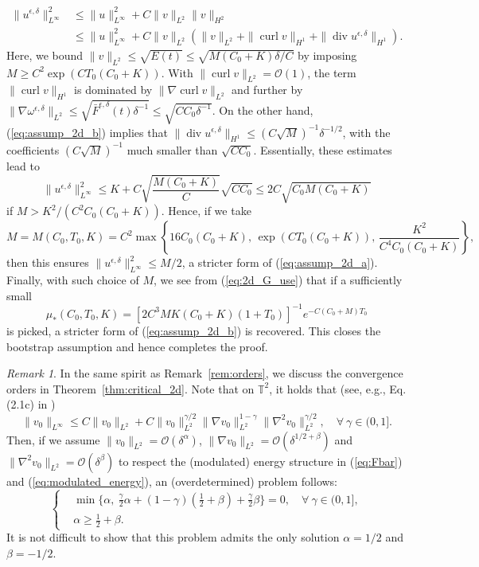 \documentclass[reqno,10pt]{amsart}
\theoremstyle{definition}
\theoremstyle{remark}
\newtheorem{remark}[theorem]{Remark}
\numberwithin{equation}{section}
\DeclareMathOperator{\dive}{div}
\DeclareMathOperator{\curl}{curl}
\begin{document}
\[
\begin{aligned}
    \|u^{\epsilon,\delta}\|_{L^\infty}^2 &\le \|u\|_{L^\infty}^2 + C\|v\|_{L^2}\|v\|_{H^2} \\
    &\le \|u\|_{L^\infty}^2 + C\|v\|_{L^2} \left( \|v\|_{L^2} + \|\curl v\|_{H^1} + \|\dive u^{\epsilon,\delta}\|_{H^1} \right).
\end{aligned}
\]
Here, we bound $\|v\|_{L^2} \le \sqrt{E(t)}\le \sqrt{M(C_0+K)\delta/C}$ by imposing $M\ge C^2 \exp{(CT_0(C_0+K))}$. With $\|\curl v\|_{L^2}=\mathcal O(1)$, the term $\|\curl v\|_{H^1}$ is dominated by $\|\nabla \curl v\|_{L^2}$ and further by $\|\nabla \omega^{\epsilon,\delta}\|_{L^2} \le \sqrt{\bar F^{\epsilon,\delta}(t)\delta^{-1}} \le \sqrt{CC_0\delta^{-1}}$. On the other hand, (\ref{eq:assump_2d_b}) implies that $\|\dive u^{\epsilon,\delta}\|_{H^1} \le (C\sqrt M)^{-1}\delta^{-1/2}$, with the coefficients $(C\sqrt M)^{-1}$ much smaller than $\sqrt{CC_0}$. Essentially, these estimates lead to
\[
    \|u^{\epsilon,\delta}\|_{L^\infty}^2 \le K+ C\sqrt{\frac{M(C_0+K)}{C}} \sqrt{CC_0} \le 2C \sqrt{C_0M(C_0+K)}
\]
if $M>K^2/(C^2C_0(C_0+K))$. Hence, if we take 
\[
    M=M(C_0,T_0, K) = C^2\max \left\{ 16C_0(C_0+K), \, \exp{(CT_0(C_0+K))}, \, \frac{K^2}{C^4C_0(C_0+K)} \right \}, 
\]
then this ensures $\|u^{\epsilon,\delta}\|_{L^\infty}^2 \le M/2$, a stricter form of (\ref{eq:assump_2d_a}). Finally, with such choice of $M$, we see from (\ref{eq:2d_G_use}) that if a sufficiently small 
\[
    \mu_*(C_0, T_0,K) = \left[ 2C^3MK(C_0+K)(1+T_0)\right]^{-1}e^{-C(C_0+M)T_0} 
\]
is picked, a stricter form of (\ref{eq:assump_2d_b}) is recovered. This closes the bootstrap assumption and hence completes the proof. 

\begin{remark} \label{rem:orders_2d}
In the same spirit as Remark~\ref{rem:orders}, we discuss the convergence orders in Theorem~\ref{thm:critical_2d}. Note that on $\mathbb T^2$, it holds that (see, e.g., Eq. (2.1c) in \cite{HRYZ25})
\[
    \|v_0\|_{L^\infty} \le C \|v_0\|_{L^2} + C \|v_0\|_{L^2}^{\gamma/2} \|\nabla v_0\|_{L^2}^{1-\gamma} \|\nabla^2v_0\|_{L^2}^{\gamma/2}, \quad \forall \ \gamma\in(0,1].
\]
Then, if we assume $\|v_0\|_{L^2}=\mathcal O(\delta^\alpha)$, $\|\nabla v_0\|_{L^2}=\mathcal O(\delta^{1/2+\beta})$ and $\|\nabla^2v_0\|_{L^2}=\mathcal O(\delta^\beta)$ to respect the (modulated) energy structure in (\ref{eq:Fbar}) and (\ref{eq:modulated_energy}), an (overdetermined) problem follows:
\[
\left\{
\begin{aligned}
    &\min\{\alpha, \ \frac{\gamma}{2}\alpha + (1-\gamma)(\frac{1}{2}+\beta)+\frac{\gamma}{2}\beta \}=0, \quad \forall \ \gamma\in(0,1], \\
    & \alpha \ge \frac{1}{2}+\beta.
\end{aligned}
\right.
\]
It is not difficult to show that this problem admits the only solution $\alpha=1/2$ and $\beta=-1/2$.
\end{remark}
\end{document}

